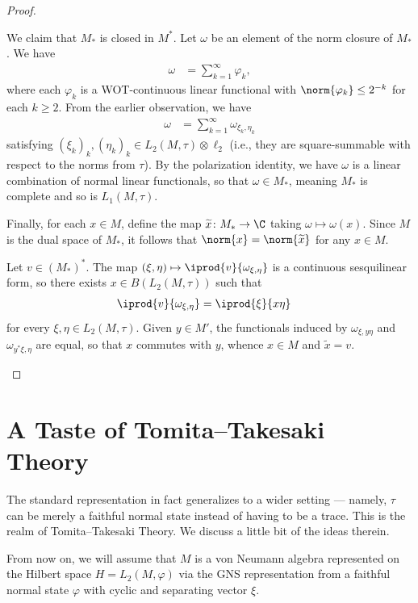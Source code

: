 \documentclass[10pt]{mypackage}
\begin{document}
\begin{proof}
\begin{enumerate}[(i)]
      We claim that $M_{\ast}$ is closed in $M^{\ast}$. Let $\omega$ be an element of the norm closure of $M_{\ast}$. We have
      \begin{align*}
        \omega &= \sum_{k=1}^{\infty}\varphi_k,
      \end{align*}
      where each $\varphi_k$ is a WOT-continuous linear functional with $\norm{\varphi_k} \leq 2^{-k}$ for each $k\geq 2$. From the earlier observation, we have
      \begin{align*}
        \omega &= \sum_{k=1}^{\infty}\omega_{\xi_k,\eta_k}
      \end{align*}
      satisfying $\left( \xi_k \right)_{k},\left( \eta_k \right)_{k}\in L_2\left( M,\tau \right)\otimes \ell_2$ (i.e., they are square-summable with respect to the norms from $\tau$). By the polarization identity, we have $\omega$ is a linear combination of normal linear functionals, so that $\omega\in M_{\ast}$, meaning $M_{\ast}$ is complete and so is $L_1\left( M,\tau \right)$.

      Finally, for each $x\in M$, define the map $ \widetilde{x} \colon M_{\ast}\rightarrow \C$ taking $\omega\mapsto \omega(x)$. Since $M$ is the dual space of $ M_{\ast} $, it follows that $\norm{x} = \norm{ \widetilde{x} }$ for any $x\in M$.

      Let $v\in \left( M_{\ast} \right)^{\ast}$. The map $ \left( \xi,\eta \right)\mapsto \iprod{v}{\omega_{\xi,\eta}} $ is a continuous sesquilinear form, so there exists $x\in B\left( L_2\left( M,\tau \right) \right)$ such that
      \begin{align*}
        \iprod{v}{\omega_{\xi,\eta}} &= \iprod{\xi}{x\eta}
      \end{align*}
      for every $\xi,\eta\in L_2\left( M,\tau \right)$. Given $y\in M'$, the functionals induced by $\omega_{\xi,y\eta}$ and $\omega_{y^{\ast}\xi,\eta}$ are equal, so that $x$ commutes with $y$, whence $x\in M$ and $ \widetilde{x} = v $.
  \end{enumerate}
\end{proof}
\section{A Taste of Tomita--Takesaki Theory}%
The standard representation in fact generalizes to a wider setting --- namely, $\tau$ can be merely a faithful normal state instead of having to be a trace. This is the realm of Tomita--Takesaki Theory. We discuss a little bit of the ideas therein.

From now on, we will assume that $M$ is a von Neumann algebra represented on the Hilbert space $H = L_2\left( M,\varphi \right)$ via the GNS representation from a faithful normal state $\varphi$ with cyclic and separating vector $\xi$.
\end{document}
